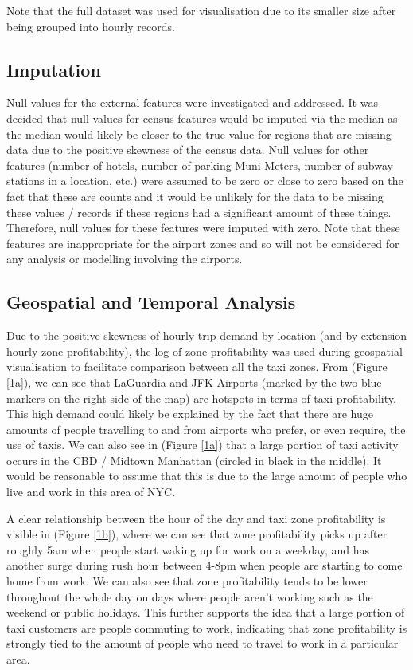 \documentclass[11pt]{article}
\begin{document}
Note that the full dataset was used for visualisation due to its smaller size after being grouped into hourly records.

\subsection{Imputation}

Null values for the external features were investigated and addressed. It was decided that null values for census features would be imputed via the median as the median would likely be closer to the true value for regions that are missing data due to the positive skewness of the census data. Null values for other features (number of hotels, number of parking Muni-Meters, number of subway stations in a location, etc.) were assumed to be zero or close to zero based on the fact that these are counts and it would be unlikely for the data to be missing these values / records if these regions had a significant amount of these things. Therefore, null values for these features were imputed with zero. Note that these features are inappropriate for the airport zones and so will not be considered for any analysis or modelling involving the airports.

\subsection{Geospatial and Temporal Analysis}

Due to the positive skewness of hourly trip demand by location (and by extension hourly zone profitability), the log of zone profitability was used during geospatial visualisation to facilitate comparison between all the taxi zones.
From (Figure \ref{1a}), we can see that LaGuardia and JFK Airports (marked by the two blue markers on the right side of the map) are hotspots in terms of taxi profitability. This high demand could likely be explained by the fact that there are huge amounts of people travelling to and from airports who prefer, or even require, the use of taxis.  We can also see in (Figure \ref{1a}) that a large portion of taxi activity occurs in the CBD / Midtown Manhattan (circled in black in the middle). It would be reasonable to assume that this is due to the large amount of people who live and work in this area of NYC. 

A clear relationship between the hour of the day and taxi zone profitability is visible in (Figure \ref{1b}), where we can see that zone profitability picks up after roughly 5am when people start waking up for work on a weekday, and has another surge during rush hour between 4-8pm when people are starting to come home from work. We can also see that zone profitability tends to be lower throughout the whole day on days where people aren't working such as the weekend or public holidays. This further supports the idea that a large portion of taxi customers are people commuting to work, indicating that zone profitability is strongly tied to the amount of people who need to travel to work in a particular area.
\end{document}

